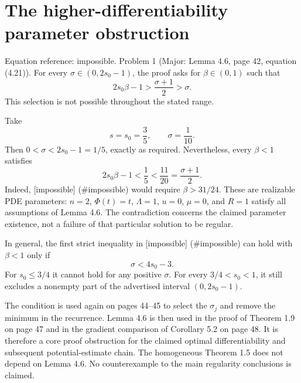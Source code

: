 \documentclass[10pt]{article}
\begin{document}
\section*{The higher-differentiability parameter obstruction}
Equation reference: impossible. Problem 1 (Major: Lemma 4.6, page 42, equation (4.21)).  For every \(\sigma\in(0,2s_0-1)\), the proof asks for \(\beta\in(0,1)\) such that \[
 2s_0\beta-1>\frac{\sigma+1}{2}>\sigma.\] This selection is not possible throughout the stated range.\par
Take \[s=s_0=\frac35,\qquad \sigma=\frac1{10}.\] Then \(0<\sigma<2s_0-1=1/5\), exactly as required. Nevertheless, every \(\beta<1\) satisfies \[2s_0\beta-1<\frac15<\frac{11}{20}
       =\frac{\sigma+1}{2}.\] Indeed, [impossible] (\#impossible) would require \(\beta>31/24\). These are realizable PDE parameters: \(n=2\), \(\Phi(t)=t\), \(\Lambda=1\), \(u=0\), \(\mu=0\), and \(R=1\) satisfy all assumptions of Lemma 4.6. The contradiction concerns the claimed parameter existence, not a failure of that particular solution to be regular.\par
In general, the first strict inequality in [impossible] (\#impossible) can hold with \(\beta<1\) only if \[\sigma<4s_0-3.\] For \(s_0\leq3/4\) it cannot hold for any positive \(\sigma\). For every \(3/4<s_0<1\), it still excludes a nonempty part of the advertised interval \((0,2s_0-1)\).\par
The condition is used again on pages 44–45 to select the \(\sigma_j\) and remove the minimum in the recurrence. Lemma 4.6 is then used in the proof of Theorem 1.9 on page 47 and in the gradient comparison of Corollary 5.2 on page 48. It is therefore a core proof obstruction for the claimed optimal differentiability and subsequent potential-estimate chain. The homogeneous Theorem 1.5 does not depend on Lemma 4.6. No counterexample to the main regularity conclusions is claimed.\par
\end{document}

